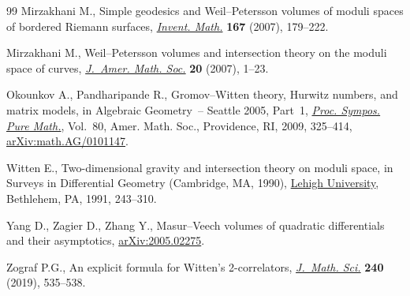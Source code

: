 \documentclass[pdftex]{sigma}
\theoremstyle{definition}
\begin{document}
\begin{thebibliography}{99}
Mirzakhani M., Simple geodesics and {W}eil--{P}etersson volumes of moduli
 spaces of bordered {R}iemann surfaces, \href{https://doi.org/10.1007/s00222-006-0013-2}{\textit{Invent. Math.}} \textbf{167}
 (2007), 179--222.

Mirzakhani M., Weil--{P}etersson volumes and intersection theory on the moduli
 space of curves, \href{https://doi.org/10.1090/S0894-0347-06-00526-1}{\textit{J.~Amer. Math. Soc.}} \textbf{20} (2007), 1--23.

Okounkov A., Pandharipande R., Gromov--{W}itten theory, {H}urwitz numbers, and
 matrix models, in Algebraic Geometry~-- {S}eattle 2005, {P}art~1,
 \href{https://doi.org/10.1090/pspum/080.1/2483941}{\textit{Proc. Sympos. Pure Math.}}, Vol.~80, Amer. Math. Soc., Providence, RI,
 2009, 325--414, \href{https://arxiv.org/abs/math.AG/0101147}{arXiv:math.AG/0101147}.

Witten E., Two-dimensional gravity and intersection theory on moduli space, in
 Surveys in Differential Geometry ({C}ambridge, {MA}, 1990), \href{https://dx.doi.org/10.4310/SDG.1990.v1.n1.a5}{Lehigh
 University}, Bethlehem, PA, 1991, 243--310.

Yang D., Zagier D., Zhang Y., Masur--Veech volumes of quadratic differentials
 and their asymptotics, \href{https://arxiv.org/abs/2005.02275}{arXiv:2005.02275}.

Zograf P.G., An explicit formula for {W}itten's 2-correlators, \href{https://doi.org/10.1007/s10958-019-04371-1}{\textit{J.~Math.
 Sci.}} \textbf{240} (2019), 535--538.

\end{thebibliography}\LastPageEnding
\end{document}

